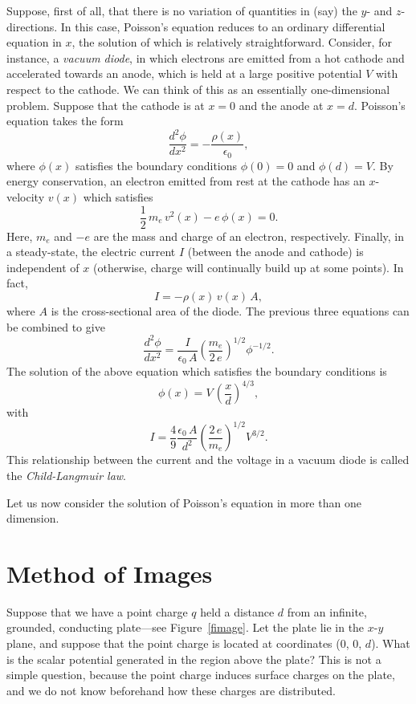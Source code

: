 Suppose, first of all, that there is no variation of quantities in (say) the $y$- and $z$-directions.
In this case, Poisson's equation reduces to an ordinary differential equation in $x$, 
the solution of which is relatively straightforward. Consider, for instance, a {\em vacuum diode},
in which electrons are emitted from a hot cathode and accelerated towards an
anode, which is held at a large positive potential $V$ with respect to the
cathode. We can think of this as an essentially one-dimensional problem. Suppose
that the cathode is at $x=0$ and the anode at $x=d$. Poisson's equation
takes the form
\begin{equation}
\frac{d^2\phi}{dx^2} = - \frac{\rho(x)}{\epsilon_0},
\end{equation}
where $\phi(x)$ satisfies the boundary conditions $\phi(0)=0$ and $\phi(d)=V$. 
By energy conservation, an electron emitted from rest at the cathode
has an $x$-velocity $v(x)$ which satisfies
\begin{equation}
\frac{1}{2}\, m_e\,v^2(x) - e\,\phi(x) = 0.
\end{equation}
Here, $m_e$ and $-e$ are the mass and charge of an electron, respectively.
Finally, in a steady-state, the electric current $I$ (between the anode and
cathode) is
independent of $x$ (otherwise, charge will continually build up at some points). In
fact,
\begin{equation}
I = -\rho(x)\,v(x)\,A,
\end{equation}
where $A$ is the cross-sectional area of the diode. 
The previous three equations can be combined to give
\begin{equation}
\frac{d^2\phi}{dx^2} = \frac{I}{\epsilon_0\,A}\left(\frac{m_e}{2\,e}\right)^{1/2}\phi^{-1/2}.
\end{equation}
The solution of the above equation which satisfies the
boundary conditions is
\begin{equation}
\phi (x)= V\,\left(\frac{x}{d}\right)^{4/3},
\end{equation}
with
\begin{equation}
I = \frac{4}{9}\frac{\epsilon_0\,A}{d^2}\left(\frac{2\,e}{m_e}\right)^{1/2}
V^{3/2}.
\end{equation}
This relationship between the  current and the voltage in a vacuum diode is
called the {\em Child-Langmuir law}.

Let us now consider the solution of Poisson's equation in more than one
dimension.

\section{Method of Images}\label{s5.10}
Suppose that we have a point charge $q$ held a distance $d$ from an infinite,
grounded, conducting plate---see Figure~\ref{fimage}. Let the plate lie in the $x$-$y$ plane, and suppose that
the point charge is located at coordinates (0, 0, $d$). What is the
scalar potential generated in the region above the plate? This is not a simple question, because the point
charge induces surface charges on the plate, and we do not know beforehand how these charges
are distributed. 

